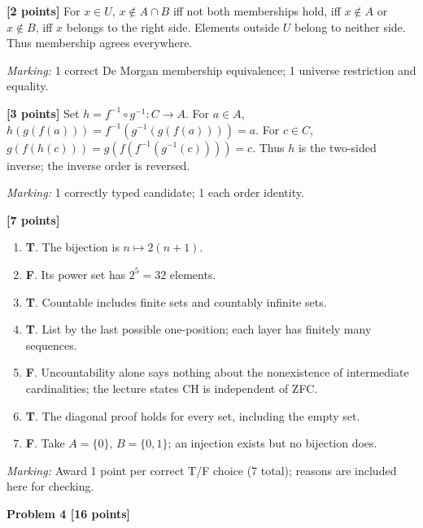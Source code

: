 \documentclass[12pt,letterpaper]{article}
\newcommand{\problemheading}[2][5\baselineskip]{\Needspace{#1}\par\noindent\hspace*{-0.625in}\textbf{#2}\par\nobreak\vspace{0.3em}}
\begin{document}
\begin{description}[font=\normalfont,leftmargin=1.2em,labelsep=0.4em]
\item[(a)] \textbf{[2 points]} For $x\in U$, $x\notin A\cap B$ iff not both memberships hold, iff $x\notin A$ or $x\notin B$, iff $x$ belongs to the right side. Elements outside $U$ belong to neither side. Thus membership agrees everywhere.
\par\textit{Marking:} 1 correct De Morgan membership equivalence; 1 universe restriction and equality.
\item[(b)] \textbf{[3 points]} Set $h=f^{-1}\circ g^{-1}:C\to A$. For $a\in A$, $h(g(f(a)))=f^{-1}(g^{-1}(g(f(a))))=a$. For $c\in C$, $g(f(h(c)))=g(f(f^{-1}(g^{-1}(c))))=c$. Thus $h$ is the two-sided inverse; the inverse order is reversed.
\par\textit{Marking:} 1 correctly typed candidate; 1 each order identity.
\item[(c)] \textbf{[7 points]} \begin{enumerate}[label=(\roman*)]\item \textbf{T}. The bijection is $n\mapsto2(n+1)$.\item \textbf{F}. Its power set has $2^5=32$ elements.\item \textbf{T}. Countable includes finite sets and countably infinite sets.\item \textbf{T}. List by the last possible one-position; each layer has finitely many sequences.\item \textbf{F}. Uncountability alone says nothing about the nonexistence of intermediate cardinalities; the lecture states CH is independent of ZFC.\item \textbf{T}. The diagonal proof holds for every set, including the empty set.\item \textbf{F}. Take $A=\{0\}$, $B=\{0,1\}$; an injection exists but no bijection does.\end{enumerate}
\par\textit{Marking:} Award 1 point per correct T/F choice (7 total); reasons are included here for checking.
\end{description}
\vspace{0.65em}
\problemheading[\dimexpr 3\baselineskip+4\baselineskip\relax]{Problem 4 [16 points]}
\end{document}
